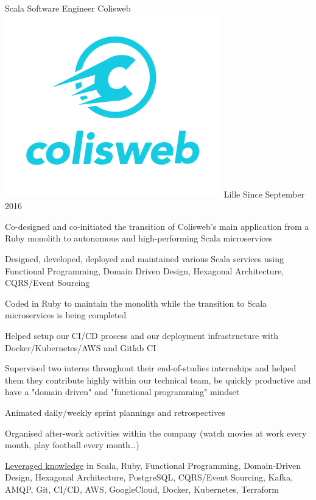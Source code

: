 \documentclass[12pt, a4paper]{awesome-cv}
\begin{document}
    \makecvheader


        \begin{cventries}

            \cventry
                {Scala Software Engineer}
                {Colisweb ~~ \includegraphics[scale=0.085]{images/logo_colisweb}}
                {Lille}
                {Since September 2016}
                {
                    \begin{cvitems}
                        \item {Co-designed and co-initiated the transition of Colisweb's main application from a Ruby monolith to autonomous and high-performing Scala microservices}
                        \item {Designed, developed, deployed and maintained various Scala services using Functional Programming, Domain Driven Design, Hexagonal Architecture, CQRS/Event Sourcing}
                        \item {Coded in Ruby to maintain the monolith while the transition to Scala microservices is being completed}
                        \item {Helped setup our CI/CD process and our deployment infrastructure with Docker/Kubernetes/AWS and Gitlab CI}
                        \item {Supervised two interns throughout their end-of-studies internships and helped them they contribute highly within our technical team, be quickly productive and have a "domain driven" and "functional programming" mindset}
                        \item {Animated daily/weekly sprint plannings and retrospectives}
                        \item {Organised after-work activities within the company (watch movies at work every month, play football every month\ldots)}
                        \item {\underline{Leveraged knowledge} in Scala, Ruby, Functional Programming, Domain-Driven Design, Hexagonal Architecture, PostgreSQL, CQRS/Event Sourcing, Kafka, AMQP, Git, CI/CD, AWS, GoogleCloud, Docker, Kubernetes, Terraform}
                    \end{cvitems}
                }


\end{cventries}
\end{document}
